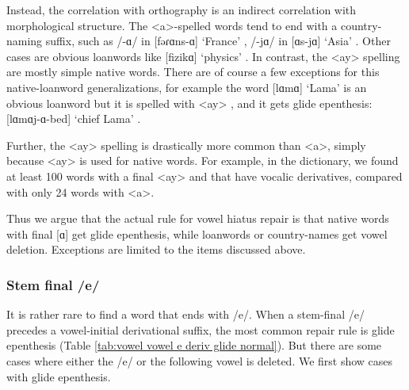 {	Instead, the correlation with orthography is an indirect  correlation with morphological structure. The <a>-spelled words tend to end with a country-naming suffix,  such as /-ɑ/ in [fəɾɑns-ɑ] `France' ,  /-jɑ/ in [ɑs-jɑ] `Asia' . Other cases are obvious loanwords like [fizikɑ] `physics' . In contrast, the  <ay>  spelling are mostly simple native words.  There are of course a few exceptions for this native-loanword generalizations, for example the word  [lɑmɑ] `Lama' is an obvious loanword but it is spelled with <ay> , and it gets glide epenthesis: [lɑmɑj-ɑ-bed] `chief Lama' . 
	
	Further, the <ay> spelling is drastically more common than <a>, simply because <ay> is used for native words. For example, in the \citeauthor{kouyoumdjian-1970-DictionaryArmenianEnglish} dictionary, we found at least 100 words with a final <ay> and that have vocalic derivatives, compared with only 24 words with <a>.  
	
	Thus we argue that the actual rule for vowel hiatus repair is that native words with final [ɑ] get glide epenthesis, while loanwords or country-names get vowel deletion. Exceptions are limited to the items discussed above.  
	
	
	
	\subsubsection{Stem final /e/}\label{section:syllable:VowelHiatus:Derived:E}
	It is rather rare to find a word that ends with /e/. When a stem-final /e/ precedes a vowel-initial derivational suffix, the most common repair rule is glide epenthesis (Table \ref{tab:vowel vowel e deriv glide normal}).  But there are some cases where either the /e/ or the following vowel is deleted. We first show cases with glide epenthesis. 
	
}
